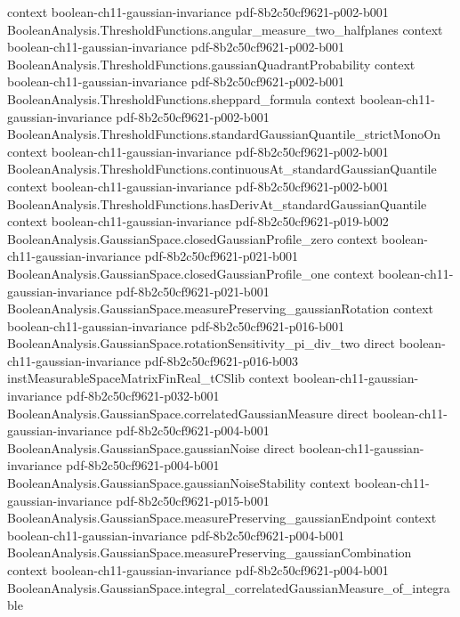 \begin{theorem}
  {context}
  {boolean-ch11-gaussian-invariance}
  {pdf-8b2c50cf9621-p002-b001}
\proofstep
  {BooleanAnalysis.ThresholdFunctions.angular_measure_two_halfplanes}
  {context}
  {boolean-ch11-gaussian-invariance}
  {pdf-8b2c50cf9621-p002-b001}
\proofstep
  {BooleanAnalysis.ThresholdFunctions.gaussianQuadrantProbability}
  {context}
  {boolean-ch11-gaussian-invariance}
  {pdf-8b2c50cf9621-p002-b001}
\proofstep
  {BooleanAnalysis.ThresholdFunctions.sheppard_formula}
  {context}
  {boolean-ch11-gaussian-invariance}
  {pdf-8b2c50cf9621-p002-b001}
\proofstep
  {BooleanAnalysis.ThresholdFunctions.standardGaussianQuantile_strictMonoOn}
  {context}
  {boolean-ch11-gaussian-invariance}
  {pdf-8b2c50cf9621-p002-b001}
\proofstep
  {BooleanAnalysis.ThresholdFunctions.continuousAt_standardGaussianQuantile}
  {context}
  {boolean-ch11-gaussian-invariance}
  {pdf-8b2c50cf9621-p002-b001}
\proofstep
  {BooleanAnalysis.ThresholdFunctions.hasDerivAt_standardGaussianQuantile}
  {context}
  {boolean-ch11-gaussian-invariance}
  {pdf-8b2c50cf9621-p019-b002}
\proofstep
  {BooleanAnalysis.GaussianSpace.closedGaussianProfile_zero}
  {context}
  {boolean-ch11-gaussian-invariance}
  {pdf-8b2c50cf9621-p021-b001}
\proofstep
  {BooleanAnalysis.GaussianSpace.closedGaussianProfile_one}
  {context}
  {boolean-ch11-gaussian-invariance}
  {pdf-8b2c50cf9621-p021-b001}
\proofstep
  {BooleanAnalysis.GaussianSpace.measurePreserving_gaussianRotation}
  {context}
  {boolean-ch11-gaussian-invariance}
  {pdf-8b2c50cf9621-p016-b001}
\proofstep
  {BooleanAnalysis.GaussianSpace.rotationSensitivity_pi_div_two}
  {direct}
  {boolean-ch11-gaussian-invariance}
  {pdf-8b2c50cf9621-p016-b003}
\proofstep
  {instMeasurableSpaceMatrixFinReal_tCSlib}
  {context}
  {boolean-ch11-gaussian-invariance}
  {pdf-8b2c50cf9621-p032-b001}
\proofstep
  {BooleanAnalysis.GaussianSpace.correlatedGaussianMeasure}
  {direct}
  {boolean-ch11-gaussian-invariance}
  {pdf-8b2c50cf9621-p004-b001}
\proofstep
  {BooleanAnalysis.GaussianSpace.gaussianNoise}
  {direct}
  {boolean-ch11-gaussian-invariance}
  {pdf-8b2c50cf9621-p004-b001}
\proofstep
  {BooleanAnalysis.GaussianSpace.gaussianNoiseStability}
  {context}
  {boolean-ch11-gaussian-invariance}
  {pdf-8b2c50cf9621-p015-b001}
\proofstep
  {BooleanAnalysis.GaussianSpace.measurePreserving_gaussianEndpoint}
  {context}
  {boolean-ch11-gaussian-invariance}
  {pdf-8b2c50cf9621-p004-b001}
\proofstep
  {BooleanAnalysis.GaussianSpace.measurePreserving_gaussianCombination}
  {context}
  {boolean-ch11-gaussian-invariance}
  {pdf-8b2c50cf9621-p004-b001}
\proofstep
  {BooleanAnalysis.GaussianSpace.integral_correlatedGaussianMeasure_of_integrable}

\end{theorem}
